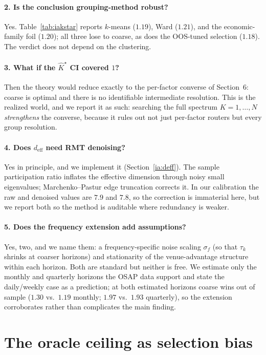 \documentclass[12pt]{article}
\theoremstyle{plain}
\theoremstyle{definition}
\begin{document}
\paragraph{2. Is the conclusion grouping-method robust?} Yes.
Table~\ref{tab:iakstar} reports $k$-means ($1.19$), Ward ($1.21$), and the
economic-family foil ($1.20$); all three lose to coarse, as does the OOS-tuned
selection ($1.18$). The verdict does not depend on the clustering.

\paragraph{3. What if the $\hat K^\star$ CI covered $1$?} Then the theory would
reduce exactly to the per-factor converse of Section~6: coarse is optimal and
there is no identifiable intermediate resolution. This is the realized world, and
we report it as such: searching the full spectrum $K=1,\dots,N$ \emph{strengthens}
the converse, because it rules out not just per-factor routers but every group
resolution.

\paragraph{4. Does $d_{\text{eff}}$ need RMT denoising?} Yes in principle, and we
implement it (Section~\ref{ia:deff}). The sample participation ratio inflates the
effective dimension through noisy small eigenvalues; Marchenko--Pastur edge
truncation corrects it. In our calibration the raw and denoised values are $7.9$
and $7.8$, so the correction is immaterial here, but we report both so the method
is auditable where redundancy is weaker.

\paragraph{5. Does the frequency extension add assumptions?} Yes, two, and we
name them: a frequency-specific noise scaling $\sigma_f$ (so that $\tau_k$ shrinks
at coarser horizons) and stationarity of the venue-advantage structure within
each horizon. Both are standard but neither is free. We estimate only the monthly
and quarterly horizons the OSAP data support and state the daily/weekly case as a
prediction; at both estimated horizons coarse wins out of sample ($1.30$ vs.\
$1.19$ monthly; $1.97$ vs.\ $1.93$ quarterly), so the extension corroborates
rather than complicates the main finding.

\section{The oracle ceiling as selection bias}
\label{ia:mirage}
\end{document}
